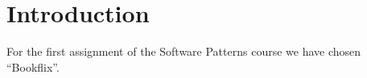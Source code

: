 \chapter*{Introduction}
For the first assignment of the Software Patterns course we have chosen ``Bookflix''.